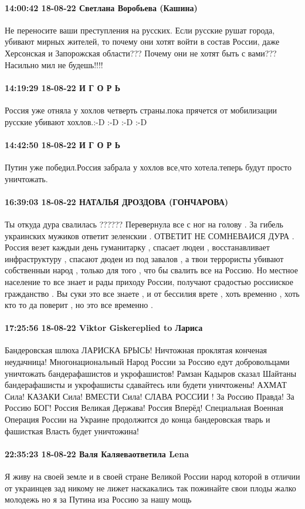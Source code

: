 \paragraph{14:00:42 18-08-22 Светлана Воробьева (Кашина)}

Не переносите ваши преступления на русских. Если русские рушат города, убивают
мирных жителей, то почему они хотят войти в состав России, даже Херсонская и
Запорожская области??? Почему они не хотят быть с вами??? Насильно мил не
будешь!!!!

\paragraph{14:19:29 18-08-22 И Г О Р Ь}

Россия уже отняла у хохлов четверть страны.пока прячется от мобилизации русские
убивают хохлов.:-D :-D :-D :-D

\paragraph{14:42:50 18-08-22 И Г О Р Ь}

Путин уже победил.Россия забрала у хохлов все,что хотела.теперь будут просто
уничтожать.

\paragraph{16:39:03 18-08-22 НАТАЛЬЯ ДРОЗДОВА (ГОНЧАРОВА)}

Ты откуда дура свалилась ??????
Перевернула все с ног на голову .
За гибель украинских мужиков ответит зеленскии .
ОТВЕТИТ НЕ СОМНЕВАИСЯ ДУРА .
Россия везет каждыи день гуманитарку , спасает людеи , восстанавливает инфраструктуру , спасают дюдеи из под завалов , а твои террористы убивают собственныи народ , только для того , что бы свалить все на Россию.
Но местное население то все знает и рады приходу России, получают срадостью россииское гражданство .
Вы суки это все знаете , и от бессилия врете , хоть временно , хоть кто то да поверит , но это все временно .

\paragraph{17:25:56 18-08-22 Viktor Giskereplied to Лариса}

Бандеровская шлюха ЛАРИСКА БРЫСЬ! Ничтожная проклятая конченая неудачница!
Многонациональный Народ России за Россию едут добровольцами уничтожать
бандерафашистов и укрофашистов! Рамзан Кадыров сказал Шайтаны бандерафашисты и
укрофашисты сдавайтесь или будети уничтожены! АХМАТ Сила! КАЗАКИ Сила! ВМЕСТИ
Сила! СЛАВА РОССИИ ! За Россию Правда! За Россию БОГ! Россия Великая Держава!
Россия Вперёд! Специальная Военная Операция России на Украине продолжится до
конца бандеровская тварь и фашисткая Власть будет уничтожина!

\paragraph{22:35:23 18-08-22 Валя Каляеваответила Lena}

Я живу на своей земле и в своей стране Великой России народ которой в отличии
от украинцев зад никому не лижет наскакались так пожинайте свои плоды жалко
молодежь но я за Путина иза Россию за нашу мощь
